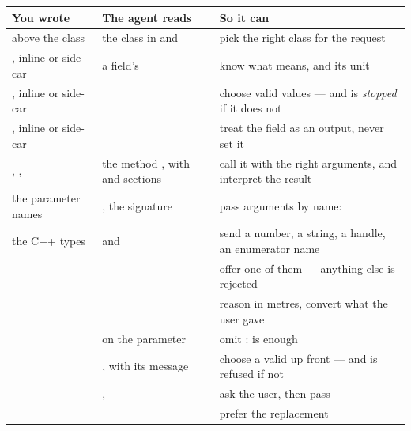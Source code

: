 \begin{center}
\small
\begin{tabular}{@{}L{4.3cm}L{4.0cm}L{4.9cm}@{}}
\toprule
\textbf{You wrote} & \textbf{The agent reads} & \textbf{So it can} \\
\midrule
\code{///} above the class & the class  in 
  and  & pick the right class for the request \\
\addlinespace
{}, inline or side-car & a field's  & know what
   means, and its unit \\
\addlinespace
{}, inline or side-car &  &
  choose valid values --- and is \emph{stopped} if it does not \\
\addlinespace
{}, inline or side-car &  & treat the field
  as an output, never set it \\
\addlinespace
{}, ,  & the method , with
   and  sections & call it with the right arguments,
  and interpret the result \\
\addlinespace
the parameter names & , the signature & pass arguments by
  name:  \\
\addlinespace
the C++ types &  and  & send a number, a string, a
  handle, an enumerator name \\
\addlinespace
{} &  & offer one of them
  --- anything else is rejected \\
\addlinespace
{} &  & reason in metres, convert what the
  user gave \\
\addlinespace
{} &  on the
  parameter & omit :  is enough \\
\addlinespace
{} & , with
  its message & choose a valid  up front --- and is refused if not \\
\addlinespace
{} & ,  &
  ask the user, then pass  \\
\addlinespace
{} &  &
  prefer the replacement \\
\bottomrule
\end{tabular}
\end{center}

